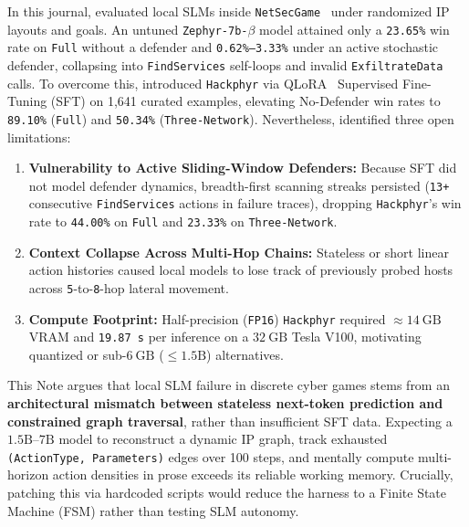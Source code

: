 \documentclass[a4paper,fleqn]{cas-dc}
\begin{document}
In this journal, \citet{rigaki2026building} evaluated local SLMs inside \texttt{NetSecGame}~\citep{garcia2023netsecgame,maria2024netsecgame} under randomized IP layouts and goals. An untuned \texttt{Zephyr-7b-$\beta$} model attained only a \texttt{23.65\%} win rate on \texttt{Full} without a defender and \texttt{0.62\%--3.33\%} under an active stochastic defender, collapsing into \texttt{FindServices} self-loops and invalid \texttt{ExfiltrateData} calls. To overcome this, \citet{rigaki2026building} introduced \texttt{Hackphyr} via QLoRA~\citep{dettmers2023qlora,hu2022lora} Supervised Fine-Tuning (SFT) on 1,641 curated examples, elevating No-Defender win rates to \texttt{89.10\%} (\texttt{Full}) and \texttt{50.34\%} (\texttt{Three-Network}). Nevertheless, \citet{rigaki2026building} identified three open limitations:
\begin{enumerate}[1.]
    \item \textbf{Vulnerability to Active Sliding-Window Defenders:} Because SFT did not model defender dynamics, breadth-first scanning streaks persisted (\texttt{13+} consecutive \texttt{FindServices} actions in failure traces), dropping \texttt{Hackphyr}'s win rate to \texttt{44.00\%} on \texttt{Full} and \texttt{23.33\%} on \texttt{Three-Network}.
    \item \textbf{Context Collapse Across Multi-Hop Chains:} Stateless or short linear action histories caused local models to lose track of previously probed hosts across \texttt{5}-to-\texttt{8}-hop lateral movement.
    \item \textbf{Compute Footprint:} Half-precision (\texttt{FP16}) \texttt{Hackphyr} required $\approx 14~\text{GB}$ VRAM and \texttt{19.87 s} per inference on a $32~\text{GB}$ Tesla V100, motivating quantized or sub-$6~\text{GB}$ ($\le 1.5\text{B}$) alternatives.
\end{enumerate}

This Note argues that local SLM failure in discrete cyber games stems from an \textbf{architectural mismatch between stateless next-token prediction and constrained graph traversal}, rather than insufficient SFT data. Expecting a $1.5\text{B}$--$7\text{B}$ model to reconstruct a dynamic IP graph, track exhausted \texttt{(ActionType, Parameters)} edges over 100 steps, and mentally compute multi-horizon action densities in prose exceeds its reliable working memory. Crucially, patching this via hardcoded scripts would reduce the harness to a Finite State Machine (FSM) rather than testing SLM autonomy.
\end{document}
